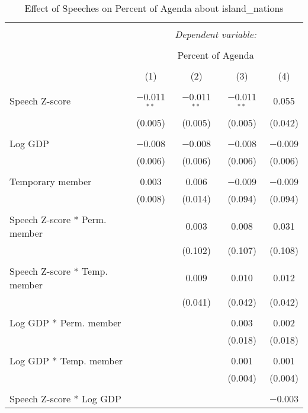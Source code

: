 
\begin{table}[!htbp] \centering 
  \caption{Effect of Speeches on Percent of Agenda about island_nations} 
  \label{} 
\begin{tabular}{@{\extracolsep{5pt}}lcccc} 
\\[-1.8ex]\hline 
\hline \\[-1.8ex] 
 & \multicolumn{4}{c}{\textit{Dependent variable:}} \\ 
\cline{2-5} 
\\[-1.8ex] & \multicolumn{4}{c}{Percent of Agenda} \\ 
\\[-1.8ex] & (1) & (2) & (3) & (4)\\ 
\hline \\[-1.8ex] 
 Speech Z-score & $-$0.011$^{**}$ & $-$0.011$^{**}$ & $-$0.011$^{**}$ & 0.055 \\ 
  & (0.005) & (0.005) & (0.005) & (0.042) \\ 
  & & & & \\ 
 Log GDP & $-$0.008 & $-$0.008 & $-$0.008 & $-$0.009 \\ 
  & (0.006) & (0.006) & (0.006) & (0.006) \\ 
  & & & & \\ 
 Temporary member & 0.003 & 0.006 & $-$0.009 & $-$0.009 \\ 
  & (0.008) & (0.014) & (0.094) & (0.094) \\ 
  & & & & \\ 
 Speech Z-score * Perm. member &  & 0.003 & 0.008 & 0.031 \\ 
  &  & (0.102) & (0.107) & (0.108) \\ 
  & & & & \\ 
 Speech Z-score * Temp. member &  & 0.009 & 0.010 & 0.012 \\ 
  &  & (0.041) & (0.042) & (0.042) \\ 
  & & & & \\ 
 Log GDP * Perm. member &  &  & 0.003 & 0.002 \\ 
  &  &  & (0.018) & (0.018) \\ 
  & & & & \\ 
 Log GDP * Temp. member &  &  & 0.001 & 0.001 \\ 
  &  &  & (0.004) & (0.004) \\ 
  & & & & \\ 
 Speech Z-score * Log GDP &  &  &  & $-$0.003 \\ 

\end{tabular}
\end{table}
